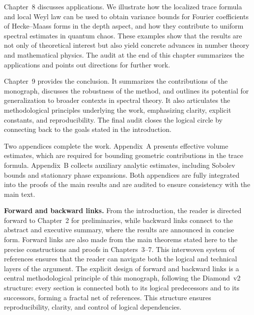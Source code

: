 Chapter~8 discusses applications. We illustrate how the localized trace formula
and local Weyl law can be used to obtain variance bounds for Fourier
coefficients of Hecke–Maass forms in the depth aspect, and how they contribute
to uniform spectral estimates in quantum chaos. These examples show that the
results are not only of theoretical interest but also yield concrete advances
in number theory and mathematical physics. The audit at the end of this chapter
summarizes the applications and points out directions for further work.

Chapter~9 provides the conclusion. It summarizes the contributions of the
monograph, discusses the robustness of the method, and outlines its potential
for generalization to broader contexts in spectral theory. It also articulates
the methodological principles underlying the work, emphasizing clarity,
explicit constants, and reproducibility. The final audit closes the logical
circle by connecting back to the goals stated in the introduction.

Two appendices complete the work. Appendix~A presents effective volume
estimates, which are required for bounding geometric contributions in the trace
formula. Appendix~B collects auxiliary analytic estimates, including Sobolev
bounds and stationary phase expansions. Both appendices are fully integrated
into the proofs of the main results and are audited to ensure consistency with
the main text.


\medskip

\noindent \textbf{Forward and backward links.}
From the introduction, the reader is directed forward to Chapter~2 for
preliminaries, while backward links connect to the abstract and executive
summary, where the results are announced in concise form. Forward links are
also made from the main theorems stated here to the precise constructions and
proofs in Chapters~3–7. This interwoven system of references ensures that the
reader can navigate both the logical and technical layers of the argument. The
explicit design of forward and backward links is a central methodological
principle of this monograph, following the Diamond~v2 structure: every section
is connected both to its logical predecessors and to its successors, forming a
fractal net of references. This structure ensures reproducibility, clarity, and
control of logical dependencies.

\medskip

